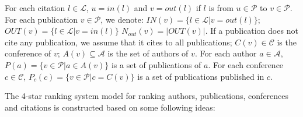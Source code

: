\documentclass[10pt,leqno,twoside]{article}
\begin{document}
For each citation $l\in \mathcal{L}$, $u = in(l)$ and $v = out(l)$ if $l$ is from $u\in \mathcal{P}$ to $v \in \mathcal{P}$.
For each publication $v \in \mathcal{P}$, we denote: $IN(v)=\{l \in \mathcal{L}|  v=out(l)\}$; $OUT(v)=\{l \in \mathcal{L}|  v=in(l)\}$ $N_{out}(v)=|OUT(v)|$. If a publication does not cite any publication, we assume that it cites to all publications; $C(v)\in \mathcal{C}$ is the conference of $v$;  $A(v)\subseteq \mathcal{A}$ is the set of authors of $v$. For each author $a\in \mathcal{A}$, $P(a)=\{v \in \mathcal{P}|  a\in A(v)\}$ is a set of publications of $a$.  For each conference $c\in \mathcal{C}$,
$P_c(c)=\{v \in \mathcal{P}|  c= C(v)\}$ is a set of publications published in $c$.

The 4-star ranking system model for ranking authors, publications, conferences and citations is constructed based on some following ideas:
\end{document}
